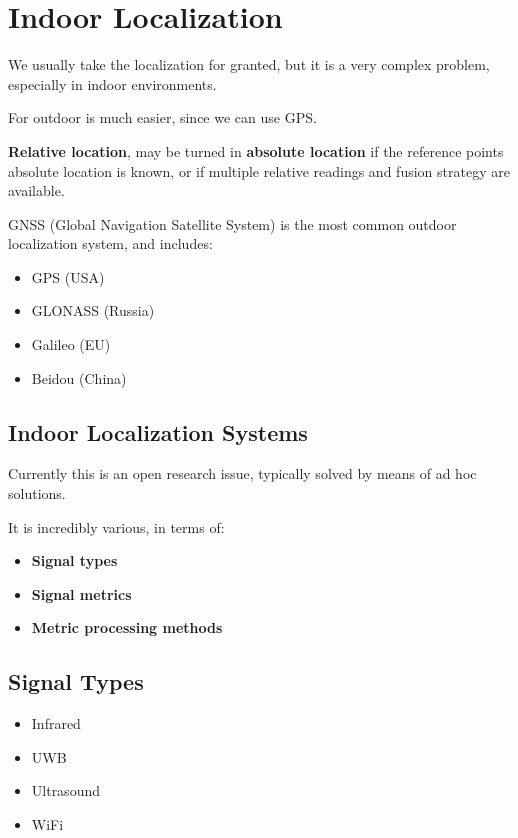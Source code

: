 \chapter{Indoor Localization}

We usually take the localization for granted, but it is a very complex problem, especially in indoor environments.

For outdoor is much easier, since we can use GPS.

\textbf{Relative location}, may be turned in \textbf{absolute location} if the reference points absolute location is known, or if multiple relative readings and fusion strategy are available.

GNSS (Global Navigation Satellite System) is the most common outdoor localization system, and includes:
\begin{itemize}
   \item GPS (USA)
   \item GLONASS (Russia)
   \item Galileo (EU)
   \item Beidou (China)
\end{itemize}

\section*{Indoor Localization Systems}
Currently this is an open research issue, typically solved by means of ad hoc solutions.

It is incredibly various, in terms of:
\begin{itemize}
   \item \textbf{Signal types}
   \item \textbf{Signal metrics}
   \item \textbf{Metric processing methods}
\end{itemize}

\section{Signal Types}
\begin{itemize}
   \item Infrared
   \item UWB
   \item Ultrasound
   \item WiFi
\end{itemize}

